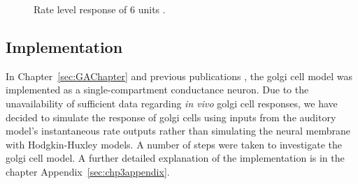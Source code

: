    
\begin{figure}[ht!]
  \centering
\caption{Rate level response of 6 units \citep[from~Fig.~2]{GhoshalKim:1997}. %
}\label{fig:GolgiKimFig2}
\end{figure}

\subsection{Implementation}

In Chapter~\ref{sec:GAChapter} and previous publications
\citep{EagerGraydenEtAl:2006a}, the golgi cell model was implemented
as a single-compartment conductance neuron. Due to the unavailability
of sufficient data regarding \emph{in vivo} golgi cell responses, we
have decided to simulate the response of golgi cells using inputs from
the auditory model's instantaneous rate outputs rather than simulating
the neural membrane with Hodgkin-Huxley models.  A number of steps
were taken to investigate the golgi cell model. A further detailed
explanation of the implementation is in the chapter
Appendix~\ref{sec:chp3appendix}.
\medskip{}

